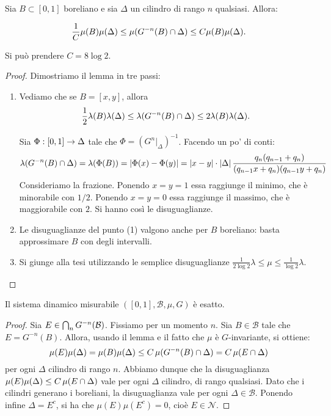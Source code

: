 \begin{lem} Sia $B\subset [0,1]$ boreliano e sia $\Delta$ un cilindro di rango $n$ qualsiasi. Allora:

$$\frac{1}{C}\mu(B)\mu(\Delta)\leq \mu(G^{-n}(B)\cap\Delta)\leq C \mu(B)\mu(\Delta).$$

Si pu\`o prendere $C=8\log 2$.
\end{lem}

\begin{proof} Dimostriamo il lemma in tre passi: \begin{enumerate}
\item Vediamo che se $B=[x,y]$, allora 
$$\frac{1}{2}\lambda(B)\lambda(\Delta)\leq \lambda(G^{-n}(B)\cap\Delta)\leq 2 \lambda(B)\lambda(\Delta).$$

Sia $\Phi:[0,1]\stackrel{}{\rightarrow} \Delta$ tale che $\Phi=(G^n|_{\Delta})^{-1}$. Facendo un po' di conti:
$$\lambda(G^{-n}(B)\cap\Delta)=\lambda(\Phi(B))=\left|\Phi(x)-\Phi(y)\right|=\left|x-y\right|\cdot \left|\Delta\right|\frac{q_n(q_{n-1}+q_n)}{(q_{n-1}x+q_n)(q_{n-1}y+q_n)}$$
 Consideriamo la frazione. Ponendo $x=y=1$ essa raggiunge il minimo, che \`e minorabile con $1/2$. Ponendo $x=y=0$ essa raggiunge il massimo, che \`e maggiorabile con $2$. Si hanno cos\`i le disuguaglianze.

\item Le disuguaglianze del punto (1) valgono anche per $B$ boreliano: basta approssimare $B$ con degli intervalli.

\item Si giunge alla tesi utilizzando le semplice disuguaglianze $\frac{1}{2\log 2}\lambda\leq\mu\leq\frac{1}{\log 2}\lambda$.

\end{enumerate}
\end{proof}

\begin{prop} Il sistema dinamico misurabile $([0,1],\mathcal{B},\mu,G)$ \`e esatto.\end{prop}

\begin{proof} Sia $E\in\bigcap_n G^{-n}(\mathcal{B})$. Fissiamo per un momento $n$. Sia $B\in\mathcal{B}$ tale che $E=G^{-n}(B)$. Allora, usando il lemma e il fatto che $\mu$ \`e $G$-invariante, si ottiene:
$$\mu(E)\mu(\Delta)=\mu(B)\mu(\Delta)\leq C\,\mu(G^{-n}(B)\cap \Delta)=C\,\mu(E\cap \Delta)$$
per ogni $\Delta$ cilindro di rango $n$.
Abbiamo dunque che la disuguaglianza $\mu(E)\mu(\Delta)\leq C\,\mu(E\cap \Delta)$ vale per ogni $\Delta$ cilindro, di rango qualsiasi. Dato che i cilindri generano i boreliani, la disuguaglianza vale per ogni $\Delta\in\mathcal{B}$. Ponendo infine $\Delta=E^c$, si ha che $\mu(E)\mu(E^c)=0$, cio\`e $E\in\mathcal{N}$.
\end{proof}

